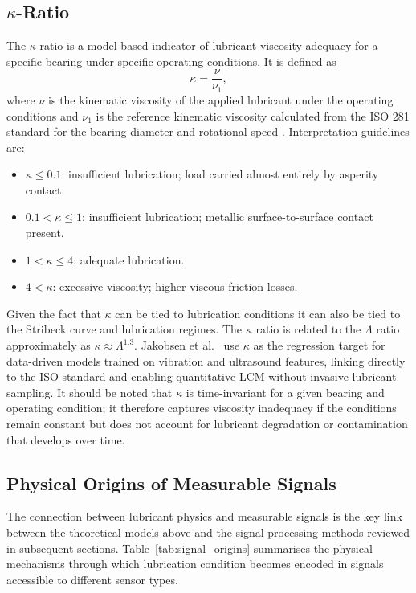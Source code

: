 \subsection{$\kappa$-Ratio}
\label{subsec:kappa}
The $\kappa$ ratio is a model-based indicator of lubricant viscosity adequacy for a specific bearing under specific operating conditions. It is defined as
\begin{equation}
\kappa = \frac{\nu}{\nu_{1}},
\end{equation}
where $\nu$ is the kinematic viscosity of the applied lubricant under the operating conditions and $\nu_{1}$ is the reference kinematic viscosity calculated from the ISO 281 standard for the bearing diameter and rotational speed \cite{jakobsen_detecting_2023}. Interpretation guidelines are:
\begin{itemize}
    \item $\kappa \leq 0.1$: insufficient lubrication; load carried almost entirely by asperity contact.
    \item $0.1 < \kappa \leq 1$: insufficient lubrication; metallic surface-to-surface contact present.
    \item $1 < \kappa \leq 4$: adequate lubrication.
    \item $4 < \kappa$: excessive viscosity; higher viscous friction losses.
\end{itemize}
Given the fact that $\kappa$ can be tied to lubrication conditions it can also be tied to the Stribeck curve and lubrication regimes. The $\kappa$ ratio is related to the $\Lambda$ ratio approximately as $\kappa \approx \Lambda^{1.3}$. Jakobsen et al.\ \cite{jakobsen_detecting_2023,jakobsen_vibration_2021} use $\kappa$ as the regression target for data-driven models trained on vibration and ultrasound features, linking directly to the ISO standard and enabling quantitative LCM without invasive lubricant sampling. It should be noted that $\kappa$ is time-invariant for a given bearing and operating condition; it therefore captures viscosity inadequacy if the conditions remain constant but does not account for lubricant degradation or contamination that develops over time.

\subsection{Physical Origins of Measurable Signals}
\label{subsec:signal_origins}
The connection between lubricant physics and measurable signals is the key link between the theoretical models above and the signal processing methods reviewed in subsequent sections. Table~\ref{tab:signal_origins} summarises the physical mechanisms through which lubrication condition becomes encoded in signals accessible to different sensor types.

